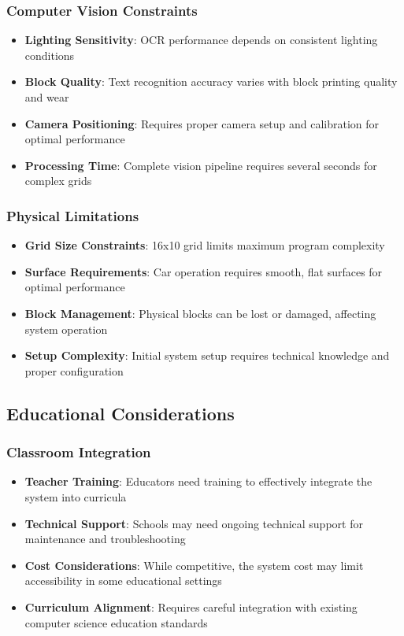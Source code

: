 \subsubsection{Computer Vision Constraints}
\begin{itemize}
    \item \textbf{Lighting Sensitivity}: OCR performance depends on consistent lighting conditions
    \item \textbf{Block Quality}: Text recognition accuracy varies with block printing quality and wear
    \item \textbf{Camera Positioning}: Requires proper camera setup and calibration for optimal performance
    \item \textbf{Processing Time}: Complete vision pipeline requires several seconds for complex grids
\end{itemize}

\subsubsection{Physical Limitations}
\begin{itemize}
    \item \textbf{Grid Size Constraints}: 16x10 grid limits maximum program complexity
    \item \textbf{Surface Requirements}: Car operation requires smooth, flat surfaces for optimal performance
    \item \textbf{Block Management}: Physical blocks can be lost or damaged, affecting system operation
    \item \textbf{Setup Complexity}: Initial system setup requires technical knowledge and proper configuration
\end{itemize}

\subsection{Educational Considerations}

\subsubsection{Classroom Integration}
\begin{itemize}
    \item \textbf{Teacher Training}: Educators need training to effectively integrate the system into curricula
    \item \textbf{Technical Support}: Schools may need ongoing technical support for maintenance and troubleshooting
    \item \textbf{Cost Considerations}: While competitive, the system cost may limit accessibility in some educational settings
    \item \textbf{Curriculum Alignment}: Requires careful integration with existing computer science education standards
\end{itemize}

